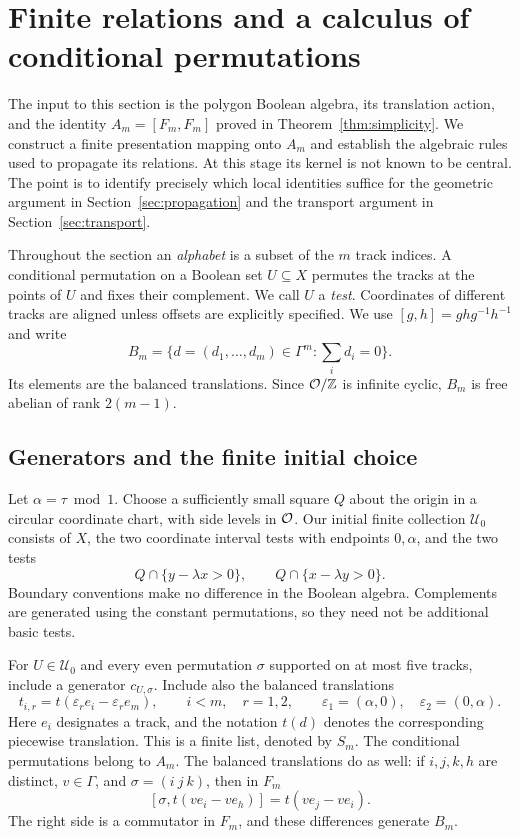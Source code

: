 \section{Finite relations and a calculus of conditional permutations}
\label{sec:lifting}

The input to this section is the polygon Boolean algebra, its translation
action, and the identity $A_m=[F_m,F_m]$ proved in
Theorem~\ref{thm:simplicity}.  We construct a finite presentation mapping
onto $A_m$ and establish the algebraic rules used to propagate its
relations.  At this stage its kernel is not known to be central.  The
point is to identify precisely which local identities suffice for the
geometric argument in Section~\ref{sec:propagation} and the transport
argument in Section~\ref{sec:transport}.

Throughout the section an \emph{alphabet} is a subset of the $m$ track
indices.  A conditional permutation on a Boolean set $U\subseteq X$
permutes the tracks at the points of $U$ and fixes their complement.
We call $U$ a \emph{test}.  Coordinates of different tracks are aligned
unless offsets are explicitly specified.  We use
$[g,h]=ghg^{-1}h^{-1}$ and write
\[
 B_m=\{d=(d_1,\ldots,d_m)\in\Gamma^m:\textstyle\sum_i d_i=0\}.
\]
Its elements are the balanced translations.  Since
$\mathcal O/\mathbb Z$ is infinite cyclic, $B_m$ is free abelian of rank $2(m-1)$.

\subsection{Generators and the finite initial choice}

Let $\alpha=\tau\bmod1$.  Choose a sufficiently small square $Q$ about
the origin in a circular coordinate chart, with side levels in $\mathcal O$.
Our initial finite collection $\mathcal U_0$ consists of $X$, the two
coordinate interval tests with endpoints $0,\alpha$, and the two tests
\[
 Q\cap\{y-\lambda x>0\},\qquad
 Q\cap\{x-\lambda y>0\}.
\]
Boundary conventions make no difference in the Boolean algebra.
Complements are generated using the constant permutations, so they
need not be additional basic tests.

For $U\in\mathcal U_0$ and every even permutation $\sigma$ supported
on at most five tracks, include a generator $c_{U,\sigma}$.  Include
also the balanced translations
\begin{equation}\label{eq:lifting-generators}
 t_{i,r}=t(\varepsilon_r e_i-\varepsilon_r e_m),
 \qquad i<m,\quad r=1,2,
 \qquad
 \varepsilon_1=(\alpha,0),\quad\varepsilon_2=(0,\alpha).
\end{equation}
Here $e_i$ designates a track, and the notation $t(d)$ denotes the
corresponding piecewise translation.  This is a finite list, denoted
by $S_m$.  The conditional permutations belong to $A_m$.  The balanced
translations do as well: if $i,j,k,h$ are distinct, $v\in\Gamma$, and
$\sigma=(i\ j\ k)$, then in $F_m$
\begin{equation}\label{eq:translation-commutator}
 [\sigma,t(v e_i-v e_h)]=t(v e_j-v e_i).
\end{equation}
The right side is a commutator in $F_m$, and these differences generate
$B_m$.


